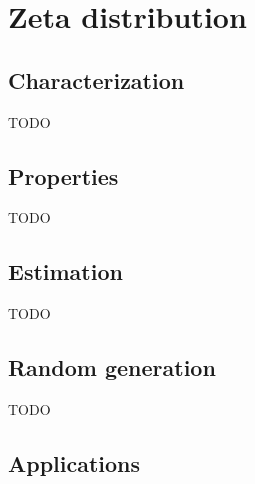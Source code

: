 \section{Zeta distribution}
\subsection{Characterization}
TODO
\subsection{Properties}
TODO
\subsection{Estimation}
TODO
\subsection{Random generation}
TODO
\subsection{Applications}
